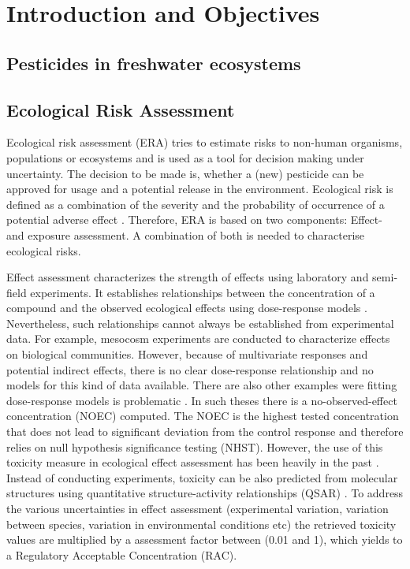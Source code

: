 \chapter{Introduction and Objectives}
\label{sec:introduction} 

\section{Pesticides in freshwater ecosystems}

\section{Ecological Risk Assessment}
Ecological risk assessment (ERA) tries to estimate risks to non-human organisms, populations or ecosystems and is used as a tool for decision making under uncertainty. 
The decision to be made is, whether a (new) pesticide can be approved for usage and a potential release in the environment. 
Ecological risk is defined as a combination of the severity and the probability of occurrence of a potential adverse effect \citep{suter_ecological_2007}. 
Therefore, ERA is based on two components: Effect- and exposure assessment.
A combination of both is needed to characterise ecological risks.

Effect assessment characterizes the strength of effects using laboratory and semi-field experiments.
It establishes relationships between the concentration of a compound and the observed ecological effects using dose-response models \citep{ritz_toward_2010}. 
Nevertheless, such relationships cannot always be established from experimental data.
For example, mesocosm experiments are conducted to characterize effects on biological communities.
However, because of multivariate responses and potential indirect effects, there is no clear dose-response relationship and no models for this kind of data available. 
There are also other examples were fitting dose-response models is problematic \citep{green_issues_2016}. 
In such theses there is a no-observed-effect concentration (NOEC) computed. 
The NOEC is the highest tested concentration that does not lead to significant deviation from the control response and therefore relies on null hypothesis significance testing (NHST). 
However, the use of this toxicity measure in ecological effect assessment has been heavily in the past \citep{laskowski_good_1995, chapman_warning:_1996, warne_noec_2008, fox_what_2012, jager_bad_2012, fox_dont_2016}. 
Instead of conducting experiments, toxicity can be also predicted from molecular structures using quantitative structure-activity relationships (QSAR) \citep{kuhne_read-across_2013, pradeep_ensemble_2016}. 
To address the various uncertainties in effect assessment (experimental variation, variation between species, variation in environmental conditions etc) the retrieved toxicity values are multiplied by a assessment factor between (0.01 and 1), which yields to a Regulatory Acceptable Concentration (RAC). %

